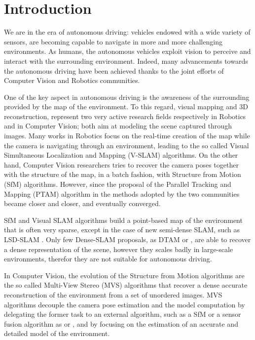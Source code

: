 
\chapter{Introduction}
\label{sec:intro}
We are in the era of autonomous driving: vehicles endowed with a wide variety of sensors, are becoming  capable to navigate in more and more challenging environments.
As humans, the autonomous vehicles exploit vision to perceive and interact with the surrounding environment.
Indeed, many advancements towards the autonomous driving have been achieved thanks to the joint efforts of Computer Vision and Robotics communities.


One of the key aspect in autonomous driving is the awareness of the surrounding provided by the map of the environment. 
To this regard, visual mapping and 3D reconstruction, represent two very active research fields respectively in Robotics and in Computer Vision; both aim at modeling the scene captured through images.
Many works in Robotics focus on the real-time creation of the map while the camera is navigating through an environment, leading to the so called Visual Simultaneous Localization and Mapping (V-SLAM) algorithms. 
On the other hand, Computer Vision researchers tries to recover the  camera poses together with the structure of the map, in a batch fashion, with Structure from Motion (SfM) algorithms.
However, since the proposal of the Parallel Tracking and Mapping (PTAM) algorithm in \cite{klein_murray07} the methods adopted by the two communities became closer and closer, and eventually converged.

SfM and Visual SLAM algorithms build a point-based map of the environment that is often very sparse, except in the case of new semi-dense SLAM, such as LSD-SLAM \cite{engel2014lsd}. 
Only few Dense-SLAM proposals, as DTAM \cite{newcombe2011dtam} or \cite{newcombe2010live}, are able to recover a dense representation of the scene, however they scales badly in large-scale environments, therefor they are not suitable for autonomous driving.

In Computer Vision, the evolution of the Structure from Motion algorithms are the  so called Multi-View Stereo (MVS) algorithms that recover a dense accurate reconstruction of the environment from a set of unordered images. 
MVS algorithms decouple the camera pose estimation and the model computation by delegating the former task to an external algorithm, such as a SfM or a sensor fusion algorithm as \cite{mouragnon_et_al07} or \cite{cucci_matteucci13}, and by focusing on the estimation of an accurate and detailed model of the environment.

